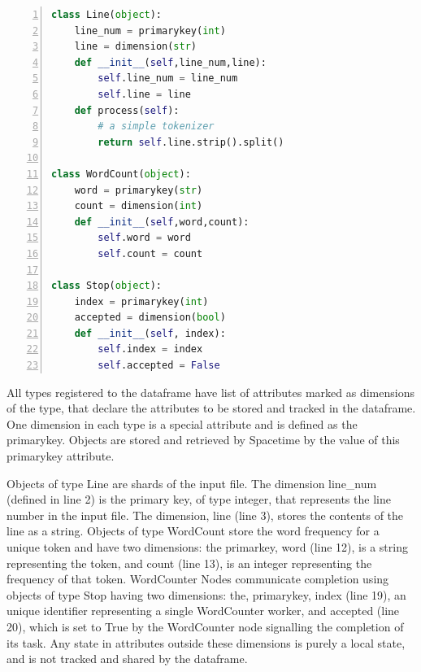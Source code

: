 \begin{lstlisting}[language=Python,basicstyle=\small, numbers=left,
label=lst:datamodel, captionpos=b, caption=The types used by the Word Counting application.]
class Line(object):
    line_num = primarykey(int)
    line = dimension(str)
    def __init__(self,line_num,line):
        self.line_num = line_num
        self.line = line
    def process(self):
        # a simple tokenizer
        return self.line.strip().split()
        
class WordCount(object):
    word = primarykey(str)
    count = dimension(int)
    def __init__(self,word,count):
        self.word = word
        self.count = count

class Stop(object):
    index = primarykey(int)
    accepted = dimension(bool)
    def __init__(self, index):
        self.index = index
        self.accepted = False

\end{lstlisting}

All types registered to the dataframe have list of attributes marked as dimensions of the type, that declare the attributes to be stored and tracked in the dataframe. One dimension in each type is a special attribute and is defined as the primarykey. Objects are stored and retrieved by Spacetime by the value of this primarykey attribute. 

Objects of type Line are shards of the input file. The dimension line\_num (defined in line 2) is the primary key, of type integer, that represents the line number in the input file. The dimension, line (line 3), stores the contents of the line as a string. Objects of type WordCount store the word frequency for a unique token and have two dimensions: the primarkey, word (line 12), is a string representing the token, and count (line 13), is an integer representing the frequency of that token. WordCounter Nodes communicate completion using objects of type Stop having two dimensions: the, primarykey, index (line 19), an unique identifier representing a single WordCounter worker, and accepted (line 20), which is set to True by the WordCounter node signalling the completion of its task. Any state in attributes outside these dimensions is purely a local state, and is not tracked and shared by the dataframe.

\vspace{3cm}

